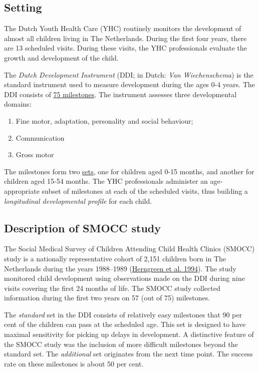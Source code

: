 \documentclass[
]{book}
\providecommand{\tightlist}{%
  \setlength{\itemsep}{0pt}\setlength{\parskip}{0pt}}
\begin{document}
\hypertarget{setting}{%
\subsection{Setting}\label{setting}}

The Dutch Youth Health Care (YHC) routinely monitors the development of almost all children living in The Netherlands. During the first four years, there are 13 scheduled visits. During these visits, the YHC professionals evaluate the growth and development of the child.

The \emph{Dutch Development Instrument} (DDI; in Dutch: \emph{Van Wiechenschema}) is the standard instrument used to measure development during the ages 0-4 years. The DDI consists of \href{https://www.ncj.nl/van-wiechen/kenmerken/}{75 milestones}. The instrument assesses three developmental domains:

\begin{enumerate}
\def\labelenumi{\arabic{enumi}.}
\tightlist
\item
  Fine motor, adaptation, personality and social behaviour;
\item
  Communication
\item
  Gross motor
\end{enumerate}

The milestones form two \href{https://www.ggdghorkennisnet.nl/?file=656\&m=1310474916\&action=file.download}{sets}, one for children aged 0-15 months, and another for children aged 15-54 months. The YHC professionals administer an age-appropriate subset of milestones at each of the scheduled visits, thus building a \emph{longitudinal developmental profile} for each child.

\hypertarget{sec:smocc}{%
\subsection{Description of SMOCC study}\label{sec:smocc}}

The Social Medical Survey of Children Attending Child Health Clinics (SMOCC) study is a nationally representative cohort of 2,151 children born in The Netherlands during the years 1988--1989 (\protect\hyperlink{ref-herngreen1994}{Herngreen et al. 1994}). The study monitored child development using observations made on the DDI during nine visits covering the first 24 months of life. The SMOCC study collected information during the first two years on 57 (out of 75) milestones.

The \emph{standard} set in the DDI consists of relatively easy milestones that 90 per cent of the children can pass at the scheduled age. This set is designed to have maximal sensitivity for picking up delays in development. A distinctive feature of the SMOCC study was the inclusion of more difficult milestones beyond the standard set. The \emph{additional} set originates from the next time point. The success rate on these milestones is about 50 per cent.
\end{document}

